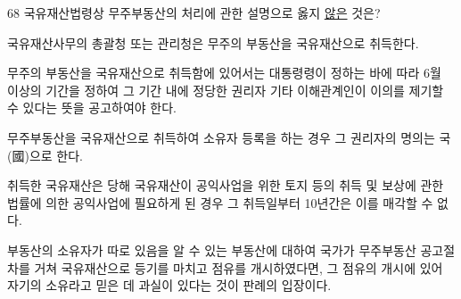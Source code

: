 \begin{question}{68}
국유재산법령상 무주부동산의 처리에 관한 설명으로 옳지 \uline{않은} 것은?
\begin{choices}
  \item 국유재산사무의 총괄청 또는 관리청은 무주의 부동산을 국유재산으로 취득한다.
  \item 무주의 부동산을 국유재산으로 취득함에 있어서는 대통령령이 정하는 바에 따라 6월 이상의 기간을 정하여 그 기간 내에 정당한 권리자 기타 이해관계인이 이의를 제기할 수 있다는 뜻을 공고하여야 한다.
  \item 무주부동산을 국유재산으로 취득하여 소유자 등록을 하는 경우 그 권리자의 명의는 국(國)으로 한다.
  \item 취득한 국유재산은 당해 국유재산이 공익사업을 위한 토지 등의 취득 및 보상에 관한 법률에 의한 공익사업에 필요하게 된 경우 그 취득일부터 10년간은 이를 매각할 수 없다.
  \item 부동산의 소유자가 따로 있음을 알 수 있는 부동산에 대하여 국가가 무주부동산 공고절차를 거쳐 국유재산으로 등기를 마치고 점유를 개시하였다면, 그 점유의 개시에 있어 자기의 소유라고 믿은 데 과실이 있다는 것이 판례의 입장이다.
\end{choices}
\end{question}
